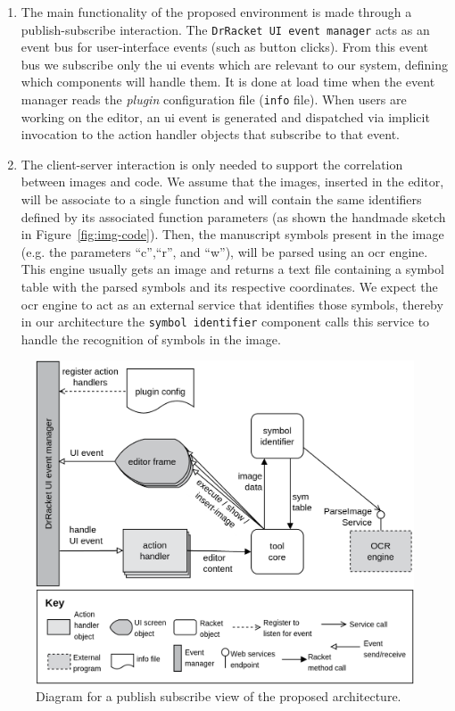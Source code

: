 \begin{enumerate}
	\item The main functionality of the proposed environment is made through a publish-subscribe interaction. The \texttt{DrRacket UI event manager} acts as an event bus for user-interface events (such as button clicks). From this event bus we subscribe only the \ac{ui} events which are relevant to our system, defining which components will handle them. It is done at load time when the event manager reads the \textit{plugin} configuration file (\texttt{info} file). When users are working on the editor, an \ac{ui} event is generated and dispatched via implicit invocation to the action handler objects that subscribe to that event.

	\item The client-server interaction is only needed to support the correlation between images and code. We assume that the images, inserted in the editor, will be associate to a single function and will contain the same identifiers defined by its associated function parameters (as shown the handmade sketch in Figure~\ref{fig:img-code}). Then, the manuscript symbols present in the image (e.g. the parameters ``c'',``r'', and ``w''), will be parsed using an \ac{ocr} engine. This engine usually gets an image and returns a text file containing a symbol table with the parsed symbols and its respective coordinates. We expect the \ac{ocr} engine to act as an external service that identifies those symbols, thereby in our architecture the \texttt{symbol identifier} component calls this service to handle the recognition of symbols in the image.
\end{enumerate}

\begin{figure}[htb]
 \vspace{-15pt}
	\centering
	\includegraphics[scale=0.19]{img/solution}
	\vspace{-5pt}
	\caption{Diagram for a publish subscribe view of the proposed architecture.}
	\label{fig:solution}
 \vspace{-10pt}
\end{figure}

